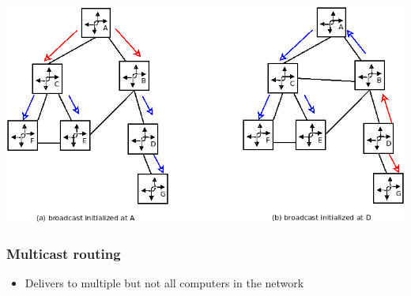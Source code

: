\documentclass[11pt]{article}
\begin{document}
\begin{center}
\includegraphics[width=.9\linewidth]{../img/spanningTree.png}
\end{center}

\subsubsection{Multicast routing}
\label{sec:org7831e03}
\begin{itemize}
\item Delivers to multiple but not all computers in the network
\end{itemize}
\end{document}
